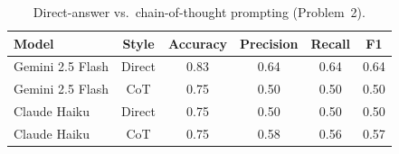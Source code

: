 \begin{table}[h]
  \centering
  \begin{tabular}{lccccc}
    \toprule
    Model & Style & Accuracy & Precision & Recall & F1 \\
    \midrule
    Gemini 2.5 Flash & Direct & 0.83 & 0.64 & 0.64 & 0.64 \\
    Gemini 2.5 Flash & CoT    & 0.75 & 0.50 & 0.50 & 0.50 \\
    Claude Haiku     & Direct & 0.75 & 0.50 & 0.50 & 0.50 \\
    Claude Haiku     & CoT    & 0.75 & 0.58 & 0.56 & 0.57 \\
    \bottomrule
  \end{tabular}
  \caption{Direct-answer vs.\ chain-of-thought prompting (Problem~2).}
  \label{tab:cot-accuracy}
\end{table}